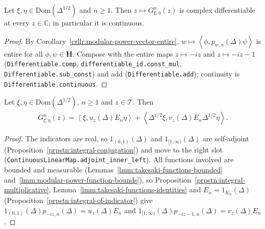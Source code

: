 \begin{lemma}
    \label{lmm:takesaki-approximants-entire}
    \leanok
    Let $\xi, \eta \in \text{Dom}(\Delta^{1/2})$ and $n \ge 1$. Then $z \mapsto G^n_{\xi,\eta}(z)$ is complex differentiable at every $z \in \mathbb{C}$; in particular it is continuous.
\end{lemma}
\begin{proof}
    \leanok
    By Corollary~\ref{crllr:modular-power-vector-entire}, $w \mapsto \left< \phi, p_{w,n}(\Delta)\psi \right>$ is entire for all $\phi, \psi \in \mathbf{H}$. Compose with the entire maps $z \mapsto -iz$ and $z \mapsto -iz - 1$ (\texttt{Differentiable.comp}, \texttt{differentiable\_id.const\_mul}, \texttt{Differentiable.sub\_const}) and add (\texttt{Differentiable.add}); continuity is \texttt{Differentiable.continuous}.
\end{proof}

\begin{lemma}
    \label{lmm:takesaki-approximants-strip}
    \leanok
    Let $\xi, \eta \in \text{Dom}(\Delta^{1/2})$, $n \ge 1$ and $z \in \mathcal{T}$. Then
    \begin{align}
        G^n_{\xi,\eta}(z) = \left< \xi, u_z(\Delta)E_n\eta \right> + \left< \Delta^{1/2}\xi, v_z(\Delta)E_n\Delta^{1/2}\eta \right>.
    \end{align}
\end{lemma}
\begin{proof}
    \leanok
    The indicators are real, so $1_{(0,1)}(\Delta)$ and $1_{[1,\infty)}(\Delta)$ are self-adjoint (Proposition~\ref{prpstn:integral-conjugation}) and move to the right slot (\texttt{ContinuousLinearMap.adjoint\_inner\_left}). All functions involved are bounded and measurable (Lemmas~\ref{lmm:takesaki-functions-bounded} and~\ref{lmm:modular-power-function-bounds}), so Proposition~\ref{prpstn:integral-multiplicative}, Lemma~\ref{lmm:takesaki-functions-identities} and $E_n = 1_{K_n}(\Delta)$ (Proposition~\ref{prpstn:integral-of-indicator}) give $1_{(0,1)}(\Delta)p_{-iz,n}(\Delta) = u_z(\Delta)E_n$ and $1_{[1,\infty)}(\Delta)p_{-iz-1,n}(\Delta) = v_z(\Delta)E_n$.
\end{proof}

